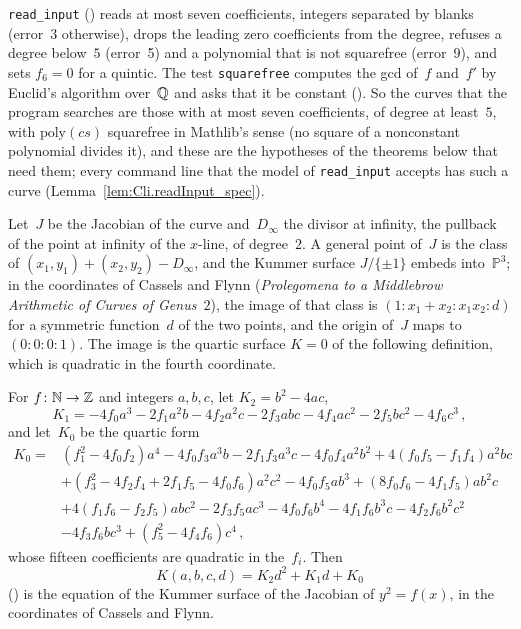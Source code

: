 \begin{remark}\label{rem:specInputC}
  \texttt{read\_input} () reads at most seven coefficients, integers
  separated by blanks (error~3 otherwise), drops the leading zero coefficients from the degree, refuses a degree below~$5$
  (error~5) and a polynomial that is not squarefree (error~9), and sets $f_6 = 0$ for a quintic.
  The test \texttt{squarefree} computes the gcd of~$f$ and~$f'$ by Euclid's algorithm over~$\mathbb{Q}$
  and asks that it be constant (). So the curves that the program
  searches are those with at most seven coefficients, of degree at least~$5$, with
  $\mathrm{poly}(cs)$ squarefree in Mathlib's sense (no square of a nonconstant polynomial divides
  it), and these are the hypotheses of the theorems below that need them; every command line that
  the model of \texttt{read\_input} accepts has such a curve (Lemma~\ref{lem:Cli.readInput_spec}).
\end{remark}

Let~$J$ be the Jacobian of the curve and~$D_\infty$ the divisor at infinity, the pullback of the
point at infinity of the $x$-line, of degree~$2$. A general point of~$J$ is the class of
$(x_1, y_1) + (x_2, y_2) - D_\infty$, and the Kummer surface $J/\{\pm 1\}$ embeds into~$\mathbb{P}^3$;
in the coordinates of Cassels and Flynn (\emph{Prolegomena to a Middlebrow Arithmetic of Curves of
Genus~$2$}), the image of that class is $(1 : x_1 + x_2 : x_1 x_2 : d)$ for a symmetric function~$d$
of the two points, and the origin of~$J$ maps to $(0 : 0 : 0 : 1)$. The image is the quartic surface
$K = 0$ of the following definition, which is quadratic in the fourth coordinate.

\begin{definition}\label{def:kummer}
  \leanok
  For $f \colon \mathbb{N} \to \mathbb{Z}$ and integers $a, b, c$, let $K_2 = b^2 - 4ac$,
  \[ K_1 = -4 f_0 a^3 - 2 f_1 a^2 b - 4 f_2 a^2 c - 2 f_3 abc - 4 f_4 ac^2 - 2 f_5 bc^2
       - 4 f_6 c^3\,, \]
  and let~$K_0$ be the quartic form
  \[ \begin{aligned}
     K_0 = {} & (f_1^2 - 4 f_0 f_2) a^4 - 4 f_0 f_3 a^3 b - 2 f_1 f_3 a^3 c - 4 f_0 f_4 a^2 b^2
       + 4 (f_0 f_5 - f_1 f_4) a^2 b c \\
     & + (f_3^2 - 4 f_2 f_4 + 2 f_1 f_5 - 4 f_0 f_6) a^2 c^2 - 4 f_0 f_5 a b^3
       + (8 f_0 f_6 - 4 f_1 f_5) a b^2 c \\
     & + 4 (f_1 f_6 - f_2 f_5) a b c^2 - 2 f_3 f_5 a c^3 - 4 f_0 f_6 b^4 - 4 f_1 f_6 b^3 c
       - 4 f_2 f_6 b^2 c^2 \\
     & - 4 f_3 f_6 b c^3 + (f_5^2 - 4 f_4 f_6) c^4\,,
  \end{aligned} \]
  whose fifteen coefficients are quadratic in the~$f_i$. Then
  \[ K(a, b, c, d) = K_2 d^2 + K_1 d + K_0 \]
  () is the equation of the Kummer surface of the Jacobian of
  $y^2 = f(x)$, in the coordinates of Cassels and Flynn.
\end{definition}

